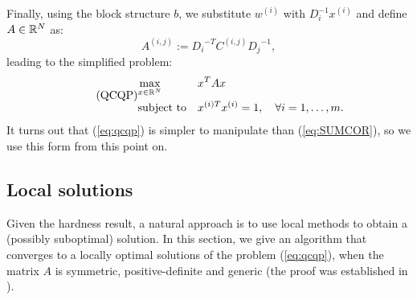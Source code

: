 Finally, using the block structure $b$, we substitute $w^{(i)}$ with $D_i^{-1} x^{(i)}$ and define $A \in \mathbb{R}^N$ as:
\begin{equation*}
A^{(i,j)} := {D_i}^{-T} C^{(i,j)} {D_j}^{-1},
\end{equation*}
leading to the simplified problem:
 \begin{equation}\label{eq:qcqp}
\tag{QCQP}
\begin{aligned}
& \underset{x \in \mathbb{R}^{N}}{\text{max}}
& & x^T A x\\
& \text{subject to}
& &x^{(i)T} x^{(i)} = 1, \quad\forall i = 1, \ldots, m.
\end{aligned}
\end{equation}
It turns out that (\ref{eq:qcqp}) is simpler to  manipulate than  (\ref{eq:SUMCOR}), so we use this form from this point on.


\subsection{Local solutions}\label{subsec:horst}
Given the hardness result, a
natural approach is to use local methods to obtain a (possibly suboptimal)
solution.  In this section, we give an algorithm that converges to a locally optimal solutions of the problem (\ref{eq:qcqp}), when the matrix $A$ is symmetric,
positive-definite and generic (the proof was established in \cite{Chu}).




